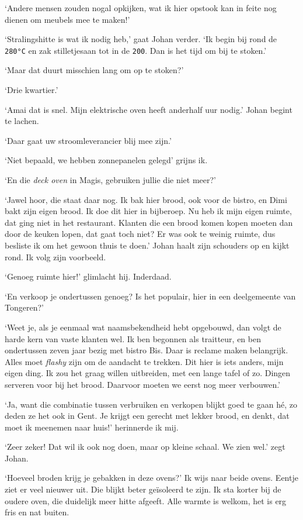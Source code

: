 \documentclass[
  11pt,
  dutch,
]{memoir}
\begin{document}
`Andere mensen zouden nogal opkijken, wat ik hier opstook kan in feite
nog dienen om meubels mee te maken!'

`Stralingshitte is wat ik nodig heb,' gaat Johan verder. `Ik begin bij
rond de \texttt{280°C} en zak stilletjesaan tot in de \texttt{200}. Dan
is het tijd om bij te stoken.'

`Maar dat duurt misschien lang om op te stoken?'

`Drie kwartier.'

`Amai dat is snel. Mijn elektrische oven heeft anderhalf uur nodig.'
Johan begint te lachen.

`Daar gaat uw stroomleverancier blij mee zijn.'

`Niet bepaald, we hebben zonnepanelen gelegd' grijns ik.

`En die \emph{deck oven} in Magis, gebruiken jullie die niet meer?'

`Jawel hoor, die staat daar nog. Ik bak hier brood, ook voor de bistro,
en Dimi bakt zijn eigen brood. Ik doe dit hier in bijberoep. Nu heb ik
mijn eigen ruimte, dat ging niet in het restaurant. Klanten die een
brood komen kopen moeten dan door de keuken lopen, dat gaat toch niet?
Er was ook te weinig ruimte, dus besliste ik om het gewoon thuis te
doen.' Johan haalt zijn schouders op en kijkt rond. Ik volg zijn
voorbeeld.

`Genoeg ruimte hier!' glimlacht hij. Inderdaad.

`En verkoop je ondertussen genoeg? Is het populair, hier in een
deelgemeente van Tongeren?'

`Weet je, als je eenmaal wat naamsbekendheid hebt opgebouwd, dan volgt
de harde kern van vaste klanten wel. Ik ben begonnen als traitteur, en
ben ondertussen zeven jaar bezig met bistro Bis. Daar is reclame maken
belangrijk. Alles moet \emph{flashy} zijn om de aandacht te trekken. Dit
hier is iets anders, mijn eigen ding. Ik zou het graag willen
uitbreiden, met een lange tafel of zo. Dingen serveren voor bij het
brood. Daarvoor moeten we eerst nog meer verbouwen.'

`Ja, want die combinatie tussen verbruiken en verkopen blijkt goed te
gaan hé, zo deden ze het ook in Gent. Je krijgt een gerecht met lekker
brood, en denkt, dat moet ik meenemen naar huis!' herinnerde ik mij.

`Zeer zeker! Dat wil ik ook nog doen, maar op kleine schaal. We zien
wel.' zegt Johan.

`Hoeveel broden krijg je gebakken in deze ovens?' Ik wijs naar beide
ovens. Eentje ziet er veel nieuwer uit. Die blijkt beter geïsoleerd te
zijn. Ik sta korter bij de oudere oven, die duidelijk meer hitte
afgeeft. Alle warmte is welkom, het is erg fris en nat buiten.
\end{document}
